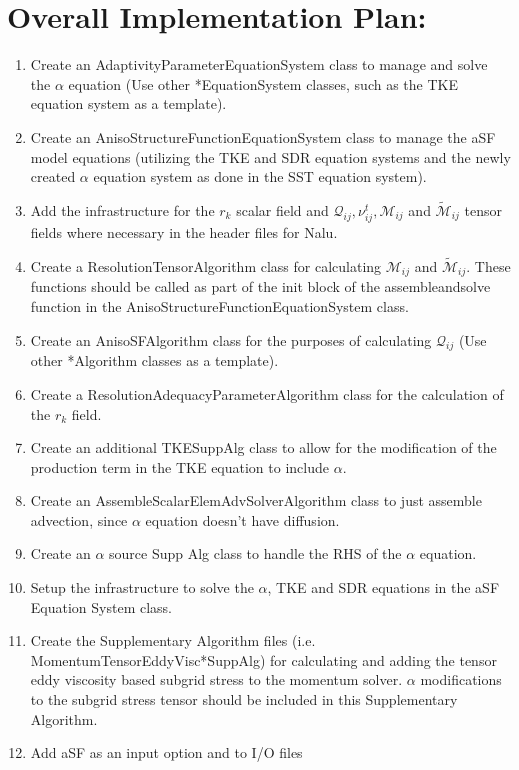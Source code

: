 \documentclass[12pt]{article}
\begin{document}
\section{Overall Implementation Plan:}
\begin{enumerate}
\item Create an AdaptivityParameterEquationSystem class to manage and solve the $\alpha$ equation (Use other *EquationSystem classes, such as the TKE equation system as a template).
\item Create an AnisoStructureFunctionEquationSystem class to manage the aSF model equations (utilizing the TKE and SDR equation systems and the newly created $\alpha$ equation system as done in the SST equation system).  
\item Add the infrastructure for the $r_k$ scalar field and $\mathcal{Q}_{ij}, \nu_{ij}^t, \mathcal{M}_{ij}$ and $\tilde{\mathcal{M}}_{ij}$ tensor fields where necessary in the header files for Nalu.  
\item Create a ResolutionTensorAlgorithm class for calculating  $\mathcal{M}_{ij}$ and $\tilde{\mathcal{M}}_{ij}$.  These functions should be called as part of the init block of the assemble\textunderscore and\textunderscore solve function in the AnisoStructureFunctionEquationSystem class.
\item Create an AnisoSFAlgorithm class for the purposes of calculating $\mathcal{Q}_{ij}$ (Use other *Algorithm classes as a template).
\item Create a ResolutionAdequacyParameterAlgorithm class for the calculation of the $r_k$ field.
\item Create an additional TKESuppAlg class to allow for the modification of the production term in the TKE equation to include $\alpha$.
\item Create an AssembleScalarElemAdvSolverAlgorithm class to just assemble advection, since $\alpha$ equation doesn't have diffusion.
\item Create an $\alpha$ source Supp Alg class to handle the RHS of the $\alpha$ equation.
\item Setup the infrastructure to solve the $\alpha$, TKE and SDR equations in the aSF Equation System class.
\item Create the Supplementary Algorithm files (i.e. MomentumTensorEddyVisc*SuppAlg) for calculating and adding the tensor eddy viscosity based subgrid stress to the momentum solver. $\alpha$ modifications to the subgrid stress tensor should be included in this Supplementary Algorithm.
\item Add aSF as an input option and to I/O files
\end{enumerate}
\end{document}
